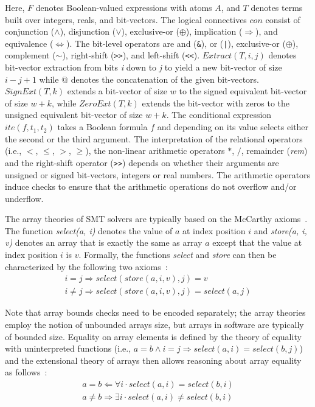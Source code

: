 \documentclass[a4paper]{llncs}
\begin{document}
\noindent 
Here, $F$ denotes Boolean-valued expressions with atoms $A$, and $T$ denotes terms
built over integers, reals, and bit-vectors.
The logical connectives $\mathit{con}$ consist of conjunction
($\wedge$), disjunction ($\vee$), exclusive-or ($\oplus$), implication
($\Rightarrow$), and equivalence ($\Leftrightarrow$). 
The bit-level operators are and
(\texttt{\&}), or (\texttt{|}), exclusive-or ($\oplus$), complement ($\sim$),
right-shift (\texttt{>>}), and left-shift (\texttt{<<}).
$\mathit{Extract}\left(T, i,j\right)$ denotes bit-vector extraction from bits
\textit{i} down to \textit{j} to yield a new bit-vector of size  $i-j+1$ while
$@$ denotes the concatenation of the given bit-vectors.
$\mathit{SignExt}\left(T, k\right)$ extends a bit-vector of size $w$ 
to the signed
equivalent bit-vector of size $w+k$, 
while $\mathit{ZeroExt}\left(T, k\right)$ extends the bit-vector
with zeros to the unsigned equivalent bit-vector of size $w+k$. The conditional
expression $\mathit{ite}(f, t_1, t_2)$ takes a Boolean formula $f$ and
depending on its value selects either the second or the third argument. 
The interpretation of the
relational operators (i.e., $<$, $\leq$, $>$, $\geq$), the non-linear
arithmetic operators $*$, $/$, remainder (\emph{rem}) and the right-shift
operator (\texttt{>>}) depends on whether their arguments are unsigned or
signed bit-vectors, integers or real numbers.  The arithmetic operators 
induce checks to ensure that the arithmetic operations do not overflow
and/or underflow. 

The array theories of SMT solvers are typically based on the 
McCarthy axioms~\cite{McCarthy62}. The function \emph{select(a, i)} 
denotes the value of $a$ at index position $i$ and \emph{store(a, i, v)} 
denotes an array that is exactly the same as array $a$ except that the 
value at index position $i$ is $v$. %
Formally, the functions \emph{select} and \emph{store} can then be characterized 
by the following two axioms~\cite{CVC07,Boolector09,Z08}:
%
\[
\begin{array}{l}
  i=j      \Rightarrow select\left(store\left(a,i,v\right),j\right)=v \\
  i \neq j \Rightarrow select\left(store\left(a,i,v\right),j\right)=select\left(a,j\right)
\end{array}
\]

\noindent
Note that array bounds checks need to be encoded separately; the array theories employ 
the notion of unbounded arrays size, but arrays in software are typically of bounded size. 
\noindent Equality on array elements is defined by the theory of equality with uninterpreted
functions (i.e., $a = b \wedge i = j \Rightarrow select\left(a,i\right) = select\left(b,j\right)$)
and the extensional theory of arrays then allows reasoning about array equality as follows~\cite{CVC07,Boolector09,Z08}:
\[
\begin{array}{l}
  a = b    \Leftarrow  \forall i \cdot select\left(a,i\right) = select\left(b,i\right)  \\
  a \neq b \Rightarrow \exists i \cdot select\left(a,i\right) \neq select\left(b,i\right)
\end{array}
\]
\end{document}
